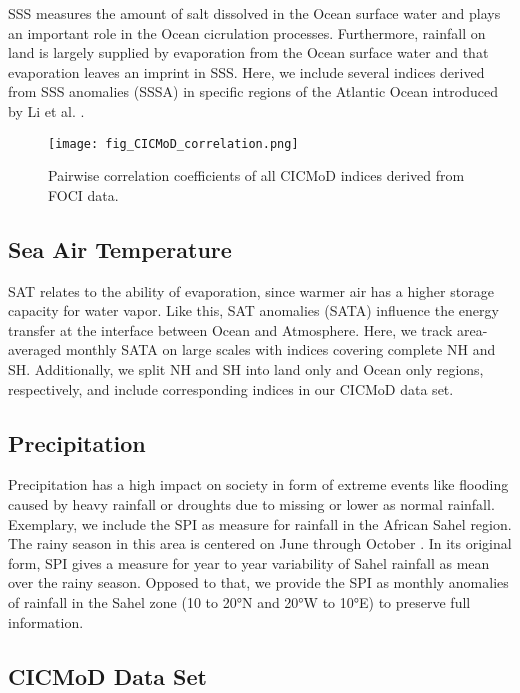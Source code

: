 \documentclass{CUP-JNL-DTM}%
\theoremstyle{definition}
\numberwithin{equation}{section}
\begin{document}
SSS measures the amount of salt dissolved in the Ocean surface water and plays an important role in the Ocean cicrulation processes. Furthermore, rainfall on land is largely supplied by evaporation from the Ocean surface water and that evaporation leaves an imprint in SSS. Here, we include several indices derived from SSS anomalies (SSSA) in specific regions of the Atlantic Ocean introduced by Li et al. \cite{Li2016}.

\begin{figure}[!b]
\texttt{[image: fig\_CICMoD\_correlation.png]}
\caption{Pairwise correlation coefficients of all CICMoD indices derived from FOCI data.}
\label{fig:CICMoD_correlation}
\end{figure}

\subsection{Sea Air Temperature}

SAT relates to the ability of evaporation, since warmer air has a higher storage capacity for water vapor. Like this, SAT anomalies (SATA) influence the energy transfer at the interface between Ocean and Atmosphere. Here, we track area-averaged monthly SATA on large scales with indices covering complete NH and SH. Additionally, we split NH and SH into land only and Ocean only regions, respectively, and include corresponding indices in our CICMoD data set.

\subsection{Precipitation}

Precipitation has a high impact on society in form of extreme events like flooding caused by heavy rainfall or droughts due to missing or lower as normal rainfall. Exemplary, we include the SPI as measure for rainfall in the African Sahel region. The rainy season in this area is centered on June through October \cite{JISAO}. In its original form, SPI gives a measure for year to year variability of Sahel rainfall as mean over the rainy season. Opposed to that, we provide the SPI as monthly anomalies of rainfall in the Sahel zone (10 to 20°N and 20°W to 10°E) \cite{Badr2014} to preserve full information.

\subsection{CICMoD Data Set}
\end{document}
